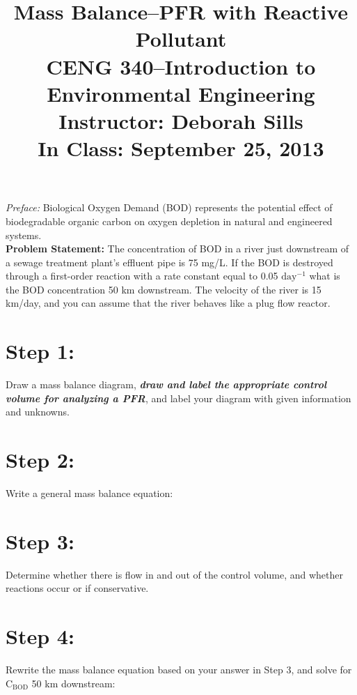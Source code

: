 \documentclass[11pt,letterpaper]{article}
\begin{document}
\setlength{\parindent}{0cm} 



\frenchspacing

\setlength{\textwidth}{6.25in}

\title {\Large{\textbf{Mass Balance--PFR with Reactive Pollutant}}\\ \large{CENG 340--Introduction to Environmental Engineering\\
Instructor: Deborah Sills\\ \textbf{In Class: September 25, 2013}}}

\author {}
\date {}
\maketitle

\vspace{-1.5cm}
\emph{Preface:} Biological Oxygen Demand (BOD) represents the potential effect of biodegradable organic carbon on oxygen depletion in natural and engineered systems.\\

\textbf{Problem Statement:} The concentration of BOD in a river just downstream of a sewage treatment plant's effluent pipe is 75 mg/L.  If the BOD is destroyed through a first-order reaction with a rate constant equal to 0.05 $\mathrm{day^{-1}}$ what is the BOD concentration 50 km downstream.  The velocity of the river is 15 km/day, and you can assume that the river behaves like a plug flow reactor.
\section *{Step 1:} 
Draw a mass balance diagram, \textbf{\emph{draw and label the appropriate control volume for analyzing a PFR}}, and label your diagram with given information and unknowns.

\vspace{0.3in}

\section *{Step 2:}
Write a general mass balance equation:
\vspace{0.2in}

\section *{Step 3:} 
Determine whether there is flow in and out of the control volume, and whether reactions occur or if conservative.
\vspace{0.2in}


\section *{Step 4:}
Rewrite the mass balance equation based on your answer in Step 3, and solve for $\mathrm{C_{BOD}}$ 50 km downstream:
\end{document}

